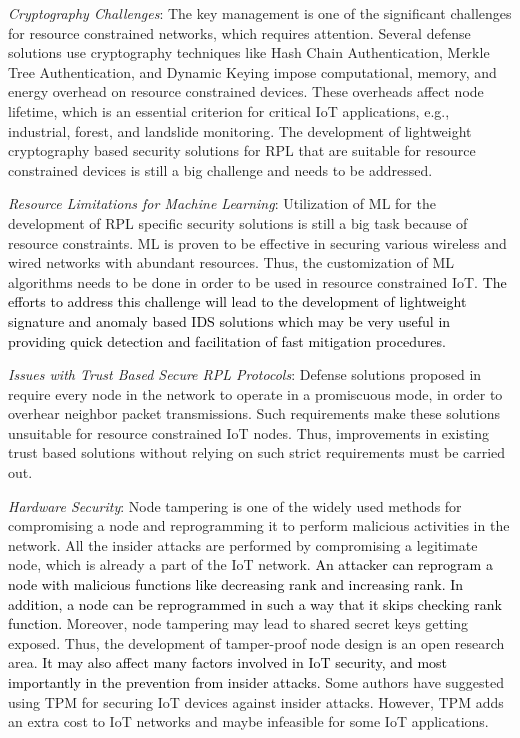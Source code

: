 \documentclass[10pt,journal,sort & compress]{IEEEtran}
\begin{document}
\textit{Cryptography Challenges}: The key management is one of the significant challenges for resource constrained networks, which requires attention. Several defense solutions \cite{Dvir2011, landsmann2013topology,khan2013wormhole, Taylor, Glissa} use cryptography techniques like Hash Chain Authentication, Merkle Tree Authentication, and Dynamic Keying impose computational, memory, and energy overhead on resource constrained devices. These overheads affect node lifetime, which is an essential criterion for critical IoT applications, e.g., industrial, forest, and landslide monitoring. The development of lightweight cryptography based security solutions for RPL that are suitable for resource constrained devices is still a big challenge and needs to be addressed.

\textit{Resource Limitations for Machine Learning}: Utilization of ML for the development of RPL specific security solutions is still a big task because of resource constraints. ML is proven to be effective in securing various wireless and wired networks with abundant resources. Thus, the customization of ML algorithms needs to be done in order to be used in resource constrained IoT. \textcolor{black}{The efforts to address this challenge will lead to the development of lightweight signature and anomaly based IDS solutions which may be very useful in providing quick detection and facilitation of fast mitigation procedures.}  

\textit{Issues with Trust Based Secure RPL Protocols}: Defense solutions proposed in \cite{Airehrour2017AJTDE, Airehrour2018} require every node in the network to operate in a promiscuous mode, in order to overhear neighbor packet transmissions. Such requirements make these solutions unsuitable for resource constrained IoT nodes. Thus, improvements in existing trust based solutions without relying on such strict requirements must be carried out. 

\textit{Hardware Security}: Node tampering is one of the widely used methods for compromising a node and reprogramming it to perform malicious activities \cite{Le2013} in the network. All the insider attacks are performed by compromising a legitimate node, which is already a part of the IoT network. \textcolor{black}{ An attacker can reprogram a node with malicious functions like decreasing rank and increasing rank. In addition, a node can be reprogrammed in such a way that it skips checking rank function.} Moreover, node tampering may lead to shared secret keys getting exposed. Thus, the development of tamper-proof node design is an open research area. \textcolor{black}{It may also affect many factors involved in IoT security, and most importantly in the prevention from insider attacks.} Some authors have suggested using TPM \cite{seeber2013towards, Djedjig2017} for securing IoT devices against insider attacks. However, TPM adds an extra cost to IoT networks and maybe infeasible for some IoT applications. 
\end{document}
